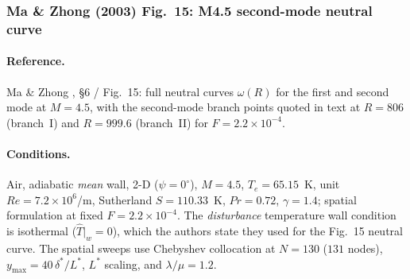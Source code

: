 \documentclass[11pt]{article}
\begin{document}
\subsubsection{Ma \& Zhong (2003) Fig.~15: M4.5 second-mode neutral curve}
\label{sec:mazhong}

\paragraph{Reference.} Ma \& Zhong \cite{mazhong2003}, \S6 / Fig.~15: full neutral curves
$\omega(R)$ for the first and second mode at $M=4.5$, with the second-mode branch points quoted in
text at $R=806$ (branch~I) and $R=999.6$ (branch~II) for $F=2.2\times10^{-4}$.

\paragraph{Conditions.} Air, adiabatic \emph{mean} wall, 2-D ($\psi=0^\circ$), $M=4.5$,
$T_e=65.15$~K, unit $Re=7.2\times10^6$/m, Sutherland $S=110.33$~K, $Pr=0.72$, $\gamma=1.4$;
spatial formulation at fixed $F=2.2\times10^{-4}$. The \emph{disturbance} temperature wall
condition is isothermal ($\hat{T}|_{w}=0$), which the authors state they used for the Fig.~15
neutral curve. The spatial sweeps use Chebyshev collocation at $N=130$ ($131$ nodes),
$y_{\max}=40\,\delta^\ast/L^\ast$, $L^\ast$ scaling, and $\lambda/\mu=1.2$.
\end{document}
